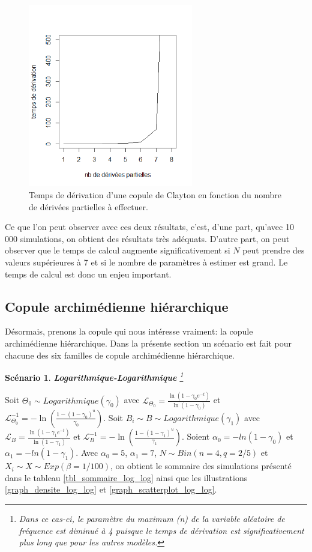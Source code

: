 \documentclass{article}
\newtheorem{Scenario}{Scénario}
\begin{document}
		\begin{figure}[H]
			\centering
			\includegraphics[height=8cm]{Graph/graph_temps_deriv.png}
			\caption{Temps de dérivation d'une copule de Clayton en fonction du nombre de dérivées partielles à effectuer.}
			\label{graph_temps_deriv}
		\end{figure}
		
			
		Ce que l'on peut observer avec ces deux résultats, c'est, d'une part, qu'avec 10\,000 simulations, on obtient des résultats très adéquats. D'autre part, on peut observer que le temps de calcul augmente significativement si $N$ peut prendre des valeurs supérieures à 7 et si le nombre de paramètres à estimer est grand. Le temps de calcul est donc un enjeu important.

	\subsection{Copule archimédienne hiérarchique}
		Désormais, prenons la copule qui nous intéresse vraiment: la copule archimédienne hiérarchique. Dans la présente section un scénario est fait pour chacune des six familles de copule archimédienne hiérarchique.\\
		
		\begin{Scenario}\label{scenario_log_log}
			\textbf{Logarithmique-Logarithmique}
			\footnote{Dans ce cas-ci, le paramètre du maximum (n) de la variable aléatoire de fréquence est diminué à 4 puisque le temps de dérivation est significativement plus long que pour les autres modèles.}
		\end{Scenario}
	
		Soit $\Theta_0 \sim Logarithmique(\gamma_0)$ avec $\mathscr{L}_{\Theta_0} = \frac{\ln(1-\gamma_0 e^{-t})}{\ln(1-\gamma_0)}$ et $\mathscr{L}^{-1}_{\Theta_0} = -\ln \left( \frac{1-(1-\gamma_0)^u}{\gamma_0} \right)$.
		Soit $B_i \sim B \sim Logarithmique(\gamma_1)$ avec $\mathscr{L}_{B} = \frac{\ln(1-\gamma_1 e^{-t})}{\ln(1-\gamma_1)}$ et $\mathscr{L}^{-1}_{B} = -\ln \left( \frac{1-(1-\gamma_1)^u}{\gamma_1} \right)$. Soient $\alpha_{0} = -ln(1-\gamma_0)$ et $\alpha_{1} = -ln(1-\gamma_1)$. Avec $\alpha_0 = 5$, $\alpha_1 = 7$, $N\sim Bin(n=4, q=2/5)$ et $X_i \sim X \sim Exp(\beta = 1/100)$, on obtient le sommaire des simulations présenté dans le tableau \ref{tbl_sommaire_log_log} ainsi que les illustrations \ref{graph_densite_log_log} et \ref{graph_scatterplot_log_log}.
		
\end{document}
